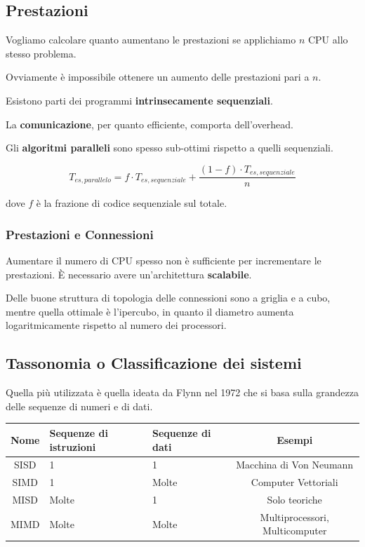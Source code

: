 \subsection{Prestazioni}
Vogliamo calcolare quanto aumentano le prestazioni se applichiamo $n$ CPU allo stesso problema.

Ovviamente è impossibile ottenere un aumento delle prestazioni pari a $n$.

\spacer
\begin{sitemize}
    \item Esistono parti dei programmi \textbf{intrinsecamente sequenziali}.
    \item La \textbf{comunicazione}, per quanto efficiente, comporta dell'overhead.
    \item Gli \textbf{algoritmi paralleli} sono spesso sub-ottimi rispetto a quelli sequenziali.
\end{sitemize}

$$T_{es, parallelo} = f\cdot T_{es, sequenziale} + \frac{(1-f)\cdot T_{es, sequenziale}}{n}$$

dove $f$ è la frazione di codice sequenziale sul totale.

\subsubsection{Prestazioni e Connessioni}
Aumentare il numero di CPU spesso non è sufficiente per incrementare le prestazioni. È necessario avere un'architettura \textbf{scalabile}.

Delle buone struttura di topologia delle connessioni sono a griglia e a cubo, mentre quella ottimale è l'ipercubo, in quanto il diametro aumenta logaritmicamente rispetto al numero dei processori.

\subsection{Tassonomia o Classificazione dei sistemi}
Quella più utilizzata è quella ideata da Flynn nel 1972 che si basa sulla grandezza delle sequenze di numeri e di dati.

\begin{center}
    \begin{tabular}{ | c | m{2cm} | m{2cm} | c | }
        \hline
        Nome & \raggedright Sequenze di istruzioni & \raggedright Sequenze di dati & Esempi                         \\
        \hline \hline
        SISD & 1                                   & 1                             & Macchina di Von Neumann        \\
        SIMD & 1                                   & Molte                         & Computer Vettoriali            \\
        MISD & Molte                               & 1                             & Solo teoriche                  \\
        MIMD & Molte                               & Molte                         & Multiprocessori, Multicomputer \\
        \hline
    \end{tabular}
\end{center}

